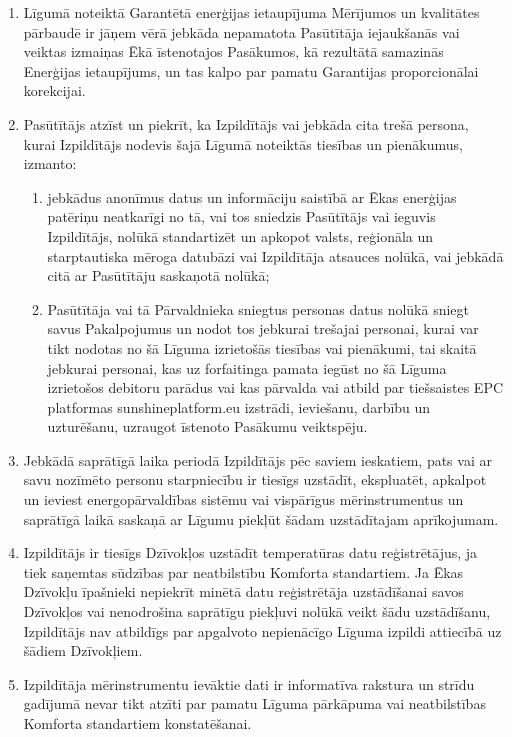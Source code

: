 \begin{multicols}{2}
\begin{enumerate}
	\item Līgumā noteiktā Garantētā enerģijas ietaupījuma Mērījumos un kvalitātes pārbaudē ir jāņem vērā jebkāda nepamatota Pasūtītāja iejaukšanās vai veiktas izmaiņas Ēkā īstenotajos Pasākumos, kā rezultātā samazinās Enerģijas ietaupījums, un tas kalpo par pamatu Garantijas proporcionālai korekcijai.
	\item Pasūtītājs atzīst un piekrīt, ka Izpildītājs vai jebkāda cita trešā persona, kurai Izpildītājs nodevis šajā Līgumā noteiktās tiesības un pienākumus, izmanto:
	\begin{enumerate}
		\item jebkādus anonīmus datus un informāciju saistībā ar Ēkas enerģijas patēriņu neatkarīgi no tā, vai tos sniedzis Pasūtītājs vai ieguvis Izpildītājs, nolūkā standartizēt un apkopot valsts, reģionāla un starptautiska mēroga datubāzi vai Izpildītāja atsauces nolūkā, vai jebkādā citā ar Pasūtītāju saskaņotā nolūkā;
		\item Pasūtītāja vai tā Pārvaldnieka sniegtus personas datus nolūkā sniegt savus Pakalpojumus un nodot tos jebkurai trešajai personai, kurai var tikt nodotas no šā Līguma izrietošās tiesības vai pienākumi, tai skaitā jebkurai personai, kas uz forfaitinga pamata iegūst no šā Līguma izrietošos debitoru parādus vai kas pārvalda vai atbild par tiešsaistes EPC platformas sunshineplatform.eu izstrādi, ieviešanu, darbību un uzturēšanu, uzraugot īstenoto Pasākumu veiktspēju.
	\end{enumerate}
	\item Jebkādā saprātīgā laika periodā Izpildītājs pēc saviem ieskatiem, pats vai ar savu nozīmēto personu starpniecību ir tiesīgs uzstādīt, ekspluatēt, apkalpot un ieviest energopārvaldības sistēmu vai vispārīgus mērinstrumentus un saprātīgā laikā saskaņā ar Līgumu piekļūt šādam uzstādītajam aprīkojumam.
	\item Izpildītājs ir tiesīgs Dzīvokļos uzstādīt temperatūras datu reģistrētājus, ja tiek saņemtas sūdzības par neatbilstību Komforta standartiem. Ja Ēkas Dzīvokļu īpašnieki nepiekrīt minētā datu reģistrētāja uzstādīšanai savos Dzīvokļos vai nenodrošina saprātīgu piekļuvi nolūkā veikt šādu uzstādīšanu, Izpildītājs nav atbildīgs par apgalvoto nepienācīgo Līguma izpildi attiecībā uz šādiem Dzīvokļiem.
	\item Izpildītāja mērinstrumentu ievāktie dati ir informatīva rakstura un strīdu gadījumā nevar tikt atzīti par pamatu Līguma pārkāpuma vai neatbilstības Komforta standartiem konstatēšanai.
\end{enumerate}


\end{multicols}
